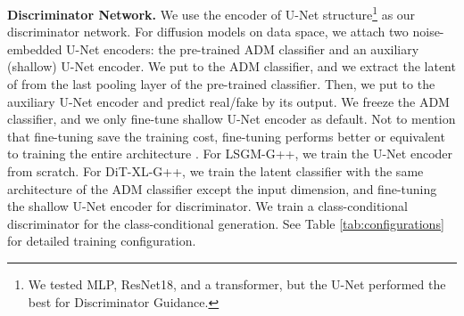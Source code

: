 \documentclass{article}
\theoremstyle{plain}
\theoremstyle{definition}
\theoremstyle{remark}
\begin{document}
\textbf{Discriminator Network.} We use the encoder of U-Net structure\footnote{We tested MLP, ResNet18, and a transformer, but the U-Net performed the best for Discriminator Guidance.} as our discriminator network. For diffusion models on data space, we attach two noise-embedded U-Net encoders: the pre-trained ADM classifier \cite{dhariwal2021diffusion} and an auxiliary (shallow) U-Net encoder. We put  to the ADM classifier, and we extract the latent  of  from the last pooling layer of the pre-trained classifier. Then, we put  to the auxiliary U-Net encoder and predict real/fake by its output. We freeze the ADM classifier, and we only fine-tune shallow U-Net encoder as default. Not to mention that fine-tuning save the training cost, fine-tuning performs better or equivalent to training the entire architecture \cite{kato2021non}. For LSGM-G++, we train the U-Net encoder from scratch. For DiT-XL-G++, we train the latent classifier with the same architecture of the ADM classifier except the input dimension, and fine-tuning the shallow U-Net encoder for discriminator. We train a class-conditional discriminator for the class-conditional generation. See Table \ref{tab:configurations} for detailed training configuration.
\end{document}
